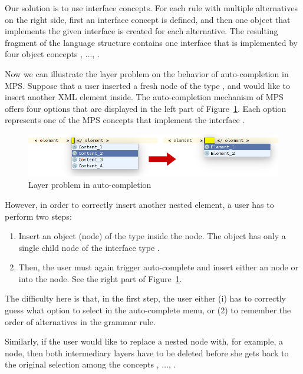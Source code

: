 Our solution is to use interface concepts.
For each rule with multiple alternatives on the right side, first an interface concept is defined, and then one object that implements the given interface is created for each alternative.
The resulting fragment of the language structure contains one interface  that is implemented by four object concepts , $\ldots$, .

Now we can illustrate the layer problem on the behavior of auto-completion in MPS.
Suppose that a user inserted a fresh node of the type , and would like to insert another XML element inside.
The auto-completion mechanism of MPS offers four options that are displayed in the left part of Figure~\ref{fig:LAYERPROBLEM}.
Each option represents one of the MPS concepts that implement the interface .

\begin{figure}[ht]
	\centering
	\includegraphics[scale=0.5]{./images/layer_problem.png}
	\caption{Layer problem in auto-completion}
	\label{fig:LAYERPROBLEM}
\end{figure}

However, in order to correctly insert another nested element, a user has to perform two steps:
\begin{enumerate}
	\item Insert an object (node) of the type  inside the  node. The  object has only a single child node of the interface type .
	\item Then, the user must again trigger auto-complete and insert either an  node or  into the  node. See the right part of Figure~\ref{fig:LAYERPROBLEM}.
\end{enumerate}
The difficulty here is that, in the first step, the user either (i) has to correctly guess what option to select in the auto-complete menu, or (2) to remember the order of alternatives in the grammar rule.

Similarly, if the user would like to replace a nested  node with, for example, a  node, then both intermediary layers have to be deleted before she gets back to the original selection among the concepts , $\ldots$, .

